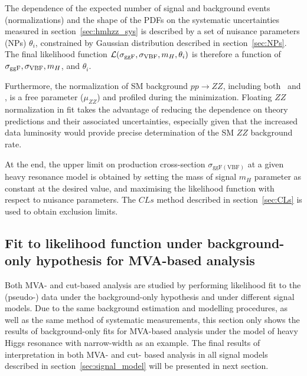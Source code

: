 The dependence of the expected number of signal and background events (normalizations) and the shape of the PDFs on the systematic uncertainties measured in section~\ref{sec:hmhzz_sys} 
is described by a set of nuisance parameters (NPs) $\theta_{i}$, constrained by Gaussian distribution described in section~\ref{sec:NPs}.
The final likelihood function ${\cal L } ( \sigma_{\mathrm{ggF}}, \sigma_{\mathrm{VBF}},m_{H},\theta_{i})$ is therefore a function of $\sigma_{\mathrm{ggF}}, \sigma_{\mathrm{VBF}} , m_{H}$, and $\theta_{i}$.

Furthermore, the normalization of SM background $pp\to ZZ$, including both \qqZZ\ and \ggZZ, is a free parameter ($\mu_{ZZ}$) and profiled during the minimization.
Floating $ZZ$ normalization in fit takes the advantage of reducing the dependence on theory predictions and their associated uncertainties,
especially given that the increased data luminosity would provide precise determination of the SM $ZZ$ background rate.

At the end, the upper limit on production cross-section $\sigma_{\mathrm{ggF(VBF)}}$ at a given heavy resonance model is obtained by setting the mass of signal $m_{H}$ parameter as constant at the desired value,
and maximising the likelihood function with respect to nuisance parameters.
The $CLs$ method described in section~\ref{sec:CLs} is used to obtain exclusion limits.

\subsection{Fit to likelihood function under background-only hypothesis for MVA-based analysis}

Both MVA- and cut-based analysis are studied by performing likelihood fit to the (pseudo-) data under the background-only hypothesis and under different signal models.
Due to the same background estimation and modelling procedures, as well as the same method of systematic measurements,
this section only shows the results of background-only fits for MVA-based analysis under the model of heavy Higgs resonance with narrow-width as an example.
The final results of interpretation in both MVA- and cut- based analysis in all signal models described in section~\ref{sec:signal_model} will be presented in next section.

